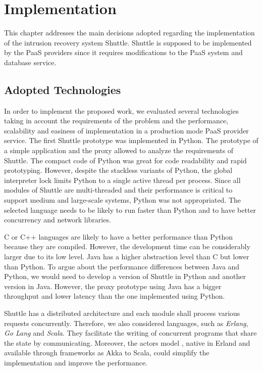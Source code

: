 \chapter{Implementation}\label{chapter:implementation}
This chapter addresses the main decisions adopted regarding the implementation of the intrusion recovery system Shuttle. Shuttle is supposed to be implemented by the \acf{PaaS} providers since it requires modifications to the \ac{PaaS} system and database service.

\section{Adopted Technologies}\label{sec:impl:adopted_technologies}
In order to implement the proposed work, we evaluated several technologies taking in account the requirements of the problem and the performance, scalability and easiness of implementation in a production mode \acf{PaaS} provider service.
The first Shuttle prototype was implemented in Python. The prototype of a simple application and the proxy allowed to analyze the requirements of Shuttle. The compact code of Python was great for code readability and rapid prototyping. However, despite the stackless variants of Python, the global interpreter lock limits Python to a single active thread per process. Since all modules of Shuttle are multi-threaded and their performance is critical to support medium and large-scale systems, Python was not appropriated. The selected language needs to be likely to run faster than Python and to have better concurrency and network libraries.

C or C++ languages are likely to have a better performance than Python because they are compiled. However, the development time can be considerably larger due to its low level. 
Java has a higher abstraction level than C but lower than Python. To argue about the performance differences between Java and Python, we would need to develop a version of Shuttle in Python and another version in Java. However, the proxy prototype using Java has a bigger throughput and lower latency than the one implemented using Python. 

Shuttle has a distributed architecture and each module shall process various requests concurrently. Therefore, we also considered languages, such as \emph{Erlang}, \emph{Go Lang} and \emph{Scala}. They facilitate the writing of concurrent programs that share the state by communicating. Moreover, the actors model \cite{actors}, native in Erland and available through frameworks as Akka \cite{akka} to Scala, could simplify the implementation and improve the performance. 

